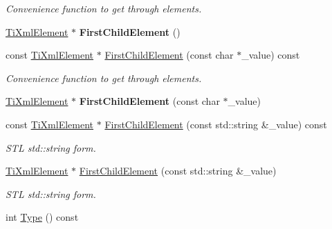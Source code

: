 \begin{DoxyCompactItemize}
\begin{DoxyCompactList}\small\item\em Convenience function to get through elements. \end{DoxyCompactList}\item 
\mbox{\label{class_ti_xml_node_aa0fecff1f3866ab33a8a25506e95db1d}} 
\hyperlink{class_ti_xml_element}{Ti\+Xml\+Element} $\ast$ {\bfseries First\+Child\+Element} ()
\item 
\mbox{\label{class_ti_xml_node_aab23fca4c2455c1d926c35d85a663842}} 
const \hyperlink{class_ti_xml_element}{Ti\+Xml\+Element} $\ast$ \hyperlink{class_ti_xml_node_aab23fca4c2455c1d926c35d85a663842}{First\+Child\+Element} (const char $\ast$\+\_\+value) const
\begin{DoxyCompactList}\small\item\em Convenience function to get through elements. \end{DoxyCompactList}\item 
\mbox{\label{class_ti_xml_node_a6936ae323675071808ac4840379e57f5}} 
\hyperlink{class_ti_xml_element}{Ti\+Xml\+Element} $\ast$ {\bfseries First\+Child\+Element} (const char $\ast$\+\_\+value)
\item 
\mbox{\label{class_ti_xml_node_abfe4a2abe61324def87fe421946f9df9}} 
const \hyperlink{class_ti_xml_element}{Ti\+Xml\+Element} $\ast$ \hyperlink{class_ti_xml_node_abfe4a2abe61324def87fe421946f9df9}{First\+Child\+Element} (const std\+::string \&\+\_\+value) const
\begin{DoxyCompactList}\small\item\em S\+TL std\+::string form. \end{DoxyCompactList}\item 
\mbox{\label{class_ti_xml_node_a7f1d7291880534c1e5cdeb392d8c1f45}} 
\hyperlink{class_ti_xml_element}{Ti\+Xml\+Element} $\ast$ \hyperlink{class_ti_xml_node_a7f1d7291880534c1e5cdeb392d8c1f45}{First\+Child\+Element} (const std\+::string \&\+\_\+value)
\begin{DoxyCompactList}\small\item\em S\+TL std\+::string form. \end{DoxyCompactList}\item 
int \hyperlink{class_ti_xml_node_a0f4dd916b2afc2ab2f1a84f3e2b8fd5d}{Type} () const

\end{DoxyCompactItemize}
